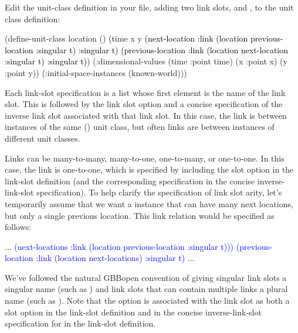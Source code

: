 \documentclass[10pt,twoside,english,pdftex]{article}
\begin{document}
Edit the  unit-class definition in your
 file, adding two link slots,
 and , to the
 unit class definition:
%
\W\supp
\begin{example}
\textcolor{darkergray}{%
  (define-unit-class location ()
    (time 
     x y
     \textcolor{black}{(next-location
      :link (location previous-location :singular t) 
      :singular t)
     (previous-location
      :link (location next-location :singular t)  
      :singular t)})
    (:dimensional-values
      (time :point time)
      (x :point x)
      (y :point y))
    (:initial-space-instances (known-world)))}
\end{example}

Each link-slot specification is a list whose first element is the name of the
link slot.  This is followed by the link slot option  and a
concise specification of the inverse link slot associated with that link slot.
In this case, the  link is
between instances of the same () unit class, but often
links are between instances of different unit classes.

Links can be many-to-many, many-to-one, one-to-many, or one-to-one.  In this
case, the  link is
one-to-one, which is specified by including the  slot
option in the link-slot definition (and the corresponding
 specification in the concise inverse-link-slot
specification).  To help clarify the specification of link slot arity, let's
temporarily assume that we want a  instance that can
have many next locations, but only a single previous location.  This link
relation would be specified as follows:
%
\W\supp
\begin{example}
\textcolor{darkergray}{%
      ...
   \textcolor{blue}{(next-locations
    :link (location previous-location :singular t)))
   (previous-location
    :link (location next-locations)  
    :singular t)}
      ...}
\end{example}

We've followed the natural GBBopen convention of giving singular link slots a
singular name (such as ) and link slots that
can contain multiple links a plural name (such as
).  Note that the  option is
associated with the  link slot as both a slot
option in the  link-slot definition and in the
concise inverse-link-slot specification for  in
the  link-slot definition.
\end{document}
